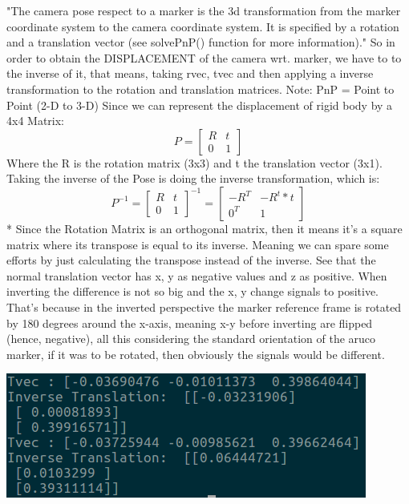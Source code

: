 \documentclass{article}
\begin{document}
"The camera pose respect to a marker is the 3d transformation from the marker coordinate system to the camera coordinate system. It is specified by a rotation and a translation vector (see solvePnP() function for more information)." So in order to obtain the DISPLACEMENT of the camera wrt. marker, we have to to the inverse of it, that means, taking rvec, tvec and then applying a inverse transformation to the rotation and translation matrices.
Note: PnP = Point to Point (2-D to 3-D)
Since we can represent the displacement of rigid body by a 4x4 Matrix:
\[
P=
  \begin{bmatrix}
    R & t \\
    0 & 1
  \end{bmatrix}
\]
Where the R is the rotation matrix (3x3) and t the translation vector (3x1).
Taking the inverse of the Pose is doing the inverse transformation, which is:
\[
P^{-1}=
  \begin{bmatrix}
    R & t \\
    0 & 1
  \end{bmatrix}^{-1}
  =
  \begin{bmatrix}
  -R^T & -R^t*t \\
  0^T & 1
  \end{bmatrix}
\]
* Since the Rotation Matrix is an orthogonal matrix, then it means it’s a square matrix where its transpose is equal to its inverse. Meaning we can spare some efforts by just calculating the transpose instead of the inverse.
See that the normal translation vector has x, y as negative values and z as positive. When inverting the difference is not so big and the x, y change signals to positive. That's because in the inverted perspective the marker reference frame is rotated by 180 degrees around the x-axis, meaning x-y before inverting are flipped (hence, negative), all this considering the standard orientation of the aruco marker, if it was to be rotated, then obviously the signals would be different.
\begin{center}
  \includegraphics[scale=0.5]{pictures/invertrans.png}
\end{center}
\end{document}
